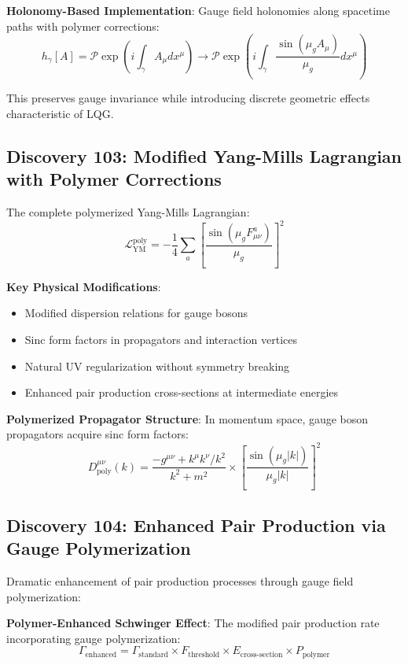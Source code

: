 \documentclass[11pt]{article}
\begin{document}
\textbf{Holonomy-Based Implementation}:
Gauge field holonomies along spacetime paths with polymer corrections:
\begin{equation}
h_\gamma[A] = \mathcal{P}\exp\left(i\int_\gamma A_\mu dx^\mu\right) \rightarrow \mathcal{P}\exp\left(i\int_\gamma \frac{\sin(\mu_g A_\mu)}{\mu_g} dx^\mu\right)
\end{equation}

This preserves gauge invariance while introducing discrete geometric effects characteristic of LQG.

\subsection{Discovery 103: Modified Yang-Mills Lagrangian with Polymer Corrections}

The complete polymerized Yang-Mills Lagrangian:
\begin{equation}
\boxed{\mathcal{L}_{\text{YM}}^{\text{poly}} = -\frac{1}{4}\sum_a \left[\frac{\sin(\mu_g F^a_{\mu\nu})}{\mu_g}\right]^2}
\end{equation}

\textbf{Key Physical Modifications}:
\begin{itemize}
\item Modified dispersion relations for gauge bosons
\item Sinc form factors in propagators and interaction vertices
\item Natural UV regularization without symmetry breaking
\item Enhanced pair production cross-sections at intermediate energies
\end{itemize}

\textbf{Polymerized Propagator Structure}:
In momentum space, gauge boson propagators acquire sinc form factors:
\begin{equation}
D^{\mu\nu}_{\text{poly}}(k) = \frac{-g^{\mu\nu} + k^\mu k^\nu/k^2}{k^2 + m^2} \times \left[\frac{\sin(\mu_g |k|)}{\mu_g |k|}\right]^2
\end{equation}

\subsection{Discovery 104: Enhanced Pair Production via Gauge Polymerization}

Dramatic enhancement of pair production processes through gauge field polymerization:

\textbf{Polymer-Enhanced Schwinger Effect}:
The modified pair production rate incorporating gauge polymerization:
\begin{equation}
\Gamma_{\text{enhanced}} = \Gamma_{\text{standard}} \times F_{\text{threshold}} \times E_{\text{cross-section}} \times P_{\text{polymer}}
\end{equation}
\end{document}
